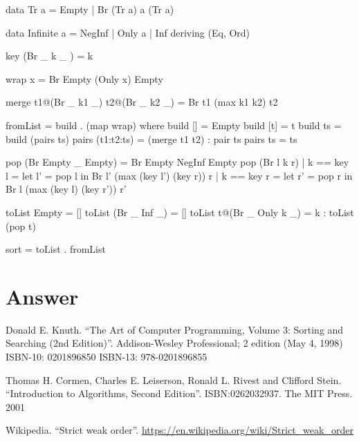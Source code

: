 \documentclass[b5paper]{article}
\begin{document}
\begin{Haskell}
data Tr a = Empty | Br (Tr a) a (Tr a)

data Infinite a = NegInf | Only a | Inf deriving (Eq, Ord)

key (Br _ k _ ) = k

wrap x = Br Empty (Only x) Empty

merge t1@(Br _ k1 _) t2@(Br _ k2 _) = Br t1 (max k1 k2) t2

fromList = build . (map wrap) where
  build [] = Empty
  build [t] = t
  build ts = build (pairs ts)
  pairs (t1:t2:ts) = (merge t1 t2) : pair ts
  pairs ts = ts

pop (Br Empty _ Empty) = Br Empty NegInf Empty
pop (Br l k r) | k == key l = let l' = pop l in Br l' (max (key l') (key r)) r
               | k == key r = let r' = pop r in Br l (max (key l) (key r')) r'

toList Empty = []
toList (Br _ Inf _) = []
toList t@(Br _ Only k _) = k : toList (pop t)

sort = toList . fromList
\end{Haskell}

\section{Answer}
\shipoutAnswer

\ifx\wholebook\relax\else
\begin{thebibliography}{99}

Donald E. Knuth. ``The Art of Computer Programming, Volume 3: Sorting and Searching (2nd Edition)''. Addison-Wesley Professional; 2 edition (May 4, 1998) ISBN-10: 0201896850 ISBN-13: 978-0201896855

Thomas H. Cormen, Charles E. Leiserson, Ronald L. Rivest and Clifford Stein.
``Introduction to Algorithms, Second Edition''. ISBN:0262032937. The MIT Press. 2001

Wikipedia. ``Strict weak order''. \url{https://en.wikipedia.org/wiki/Strict_weak_order}

\end{thebibliography}

\expandafter\enddocument
\fi
\end{document}
